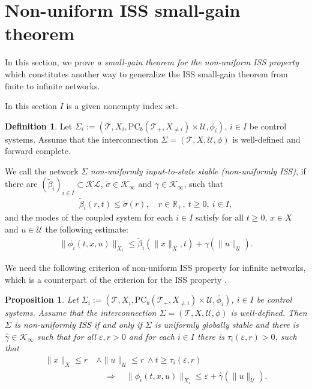 \documentclass[twocolumn]{IEEEtran} %
\newtheorem{proposition}[theorem]{Proposition}
\theoremstyle{definition}
\newtheorem{definition}[theorem]{Definition}
\newcommand{\tm}{\times}%
\newcommand{\Uc}{\mathcal{U}}%
\newcommand{\R}{\mathbb{R}}%
\newcommand{\Kinf}{\mathcal{K_\infty}}%
\newcommand{\KL}{\mathcal{KL}}%
\newcommand{\ep}{\varepsilon}%
\newcommand{\PC}{\mathrm{PC}}%
\newcommand{\T}{\ensuremath{\mathcal{T}}}  %
\newcommand \qrq   {\quad\Rightarrow\quad}
\begin{document}
 




\section{Non-uniform ISS small-gain theorem}
\label{sec:Non-uniform ISS small-gain theorem}


In this section, we prove \emph{a small-gain theorem for the non-uniform ISS property} which constitutes another way to generalize the ISS small-gain theorem from finite to infinite networks.%

In this section $I$ is a given nonempty index set.
\begin{definition}
\label{def:Non-uniform-ISS} 
Let $\Sigma_i:=(\T, X_i,\PC_b(\T_+,X_{\neq i}) \tm \Uc,\bar{\phi}_i)$, $i\in I$ be control systems. Assume that the interconnection $\Sigma=(\T, X,\Uc,\phi)$ is well-defined and forward complete.

We call the network $\Sigma$ \emph{non-uniformly input-to-state stable (non-uniformly ISS)}, if there are $(\tilde{\beta}_i)_{i\in I } \subset \KL$, $\tilde{\sigma} \in\Kinf$ and $\gamma\in\Kinf$, such that 
\begin{eqnarray}
\tilde{\beta}_i(r,t)\leq \tilde{\sigma}(r), \quad r\in\R_+,\ t\geq 0,\ i\in I,
\label{eq:Bounds_on_beta_coupled-system}
\end{eqnarray}
and the modes of the coupled system for each $i\in I$ satisfy for all $t\geq 0$, $x\in X$ and $u\in\Uc$ the following estimate:
\begin{eqnarray}
\|\phi_i(t,x,u)\|_{X_i} \leq \tilde{\beta}_i(\|x\|_X,t) + \gamma(\|u\|_{\Uc}).
\label{eq:non-uniform-ISS}
\end{eqnarray}
\end{definition}

We need the following criterion of non-uniform ISS property for infinite networks, which is a counterpart of the criterion for the ISS property \cite[Lemma 8]{MiW18b}.
\begin{proposition}
\label{prop:Criterion-non-uniform-ISS} 
Let $\Sigma_i:=(\T, X_i,\PC_b(\T_+,X_{\neq i}) \tm \Uc,\bar{\phi}_i)$, $i\in I$ be control systems. Assume that the interconnection $\Sigma=(\T,X,\Uc,\phi)$ is well-defined.
Then $\Sigma$ is non-uniformly ISS if and only if 
$\Sigma$ is uniformly globally stable and there is $\hat{\gamma}\in\Kinf$ such that for all $\varepsilon,r>0$ and for each $i\in I$ there is $\tau_i(\ep,r)>0$, such that
\begin{align}
\|x\|_X\leq r\ &\wedge \|u\|_\Uc \leq r \ \wedge t\geq\tau_i(\ep,r)\nonumber\\
& \qrq \|\phi_i(t, x, u)\|_{X_i} \leq \ep + \hat{\gamma}(\|u\|_\Uc).
\label{eq:nonuniform-in-i-UAG-bounded-inputs}
\end{align}
\end{proposition}
\end{document}
